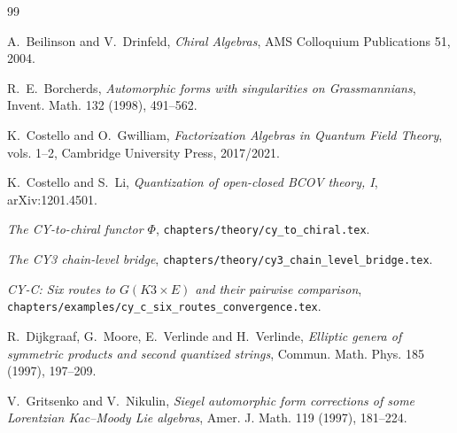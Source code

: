 \documentclass[11pt]{amsart}
\theoremstyle{plain}
\theoremstyle{definition}
\theoremstyle{remark}
\begin{document}
\begin{thebibliography}{99}

A.~Beilinson and V.~Drinfeld,
\emph{Chiral Algebras}, AMS Colloquium Publications 51, 2004.

R.~E.~Borcherds,
\emph{Automorphic forms with singularities on Grassmannians},
Invent. Math. 132 (1998), 491--562.

K.~Costello and O.~Gwilliam,
\emph{Factorization Algebras in Quantum Field Theory},
vols. 1--2, Cambridge University Press, 2017/2021.

K.~Costello and S.~Li,
\emph{Quantization of open-closed BCOV theory, I},
arXiv:1201.4501.

\emph{The CY-to-chiral functor $\Phi$},
\texttt{chapters/theory/cy\_to\_chiral.tex}.

\emph{The CY3 chain-level bridge},
\texttt{chapters/theory/cy3\_chain\_level\_bridge.tex}.

\emph{CY-C: Six routes to $G(K3\times E)$ and their pairwise comparison},
\texttt{chapters/\allowbreak examples/\allowbreak cy\_\allowbreak c\_\allowbreak six\_\allowbreak routes\_\allowbreak convergence.tex}.

R.~Dijkgraaf, G.~Moore, E.~Verlinde and H.~Verlinde,
\emph{Elliptic genera of symmetric products and second quantized strings},
Commun. Math. Phys. 185 (1997), 197--209.

V.~Gritsenko and V.~Nikulin,
\emph{Siegel automorphic form corrections of some Lorentzian Kac--Moody
Lie algebras}, Amer. J. Math. 119 (1997), 181--224.

\end{thebibliography}
\end{document}
